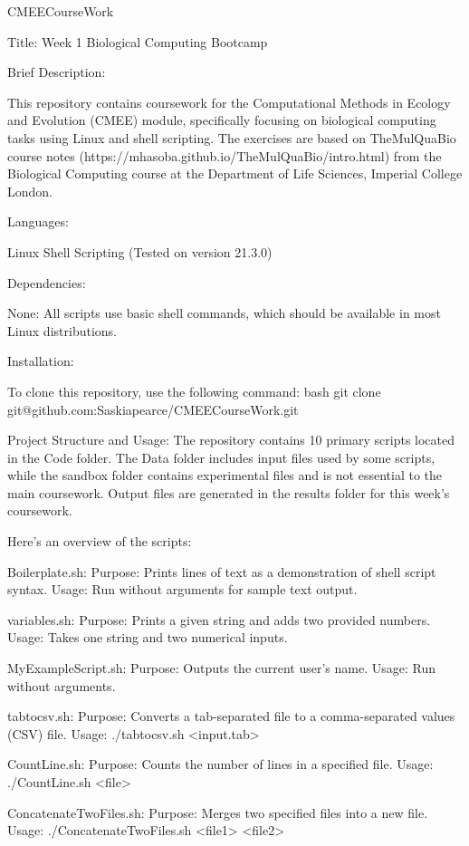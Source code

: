 CMEECourseWork

Title: Week 1 Biological Computing Bootcamp

Brief Description:

This repository contains coursework for the Computational Methods in Ecology and Evolution (CMEE) module, specifically focusing on biological computing tasks using Linux and shell scripting. The exercises are based on TheMulQuaBio course notes (https://mhasoba.github.io/TheMulQuaBio/intro.html) from the Biological Computing course at the Department of Life Sciences, Imperial College London.

Languages:

Linux Shell Scripting (Tested on version 21.3.0)

Dependencies:

None: All scripts use basic shell commands, which should be available in most Linux distributions.

Installation:

To clone this repository, use the following command: bash git clone git@github.com:Saskiapearce/CMEECourseWork.git

Project Structure and Usage: The repository contains 10 primary scripts located in the Code folder. The Data folder includes input files used by some scripts, while the sandbox folder contains experimental files and is not essential to the main coursework. Output files are generated in the results folder for this week’s coursework.

Here’s an overview of the scripts:

Boilerplate.sh:
    Purpose: Prints lines of text as a demonstration of shell script syntax.
    Usage: Run without arguments for sample text output.

variables.sh:
    Purpose: Prints a given string and adds two provided numbers.
    Usage: Takes one string and two numerical inputs.

MyExampleScript.sh:
    Purpose: Outputs the current user's name.
    Usage: Run without arguments.

tabtocsv.sh:
    Purpose: Converts a tab-separated file to a comma-separated values (CSV) file.
    Usage: ./tabtocsv.sh <input.tab>

CountLine.sh:
    Purpose: Counts the number of lines in a specified file.
    Usage: ./CountLine.sh <file>

ConcatenateTwoFiles.sh:
    Purpose: Merges two specified files into a new file.
    Usage: ./ConcatenateTwoFiles.sh <file1> <file2>

